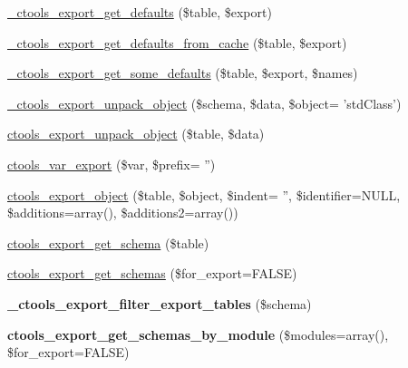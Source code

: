 \begin{DoxyCompactItemize}
\item 
\hyperlink{export_8inc_ad9a45511f03c5f3260f3e102a804229c}{\_\-ctools\_\-export\_\-get\_\-defaults} (\$table, \$export)
\item 
\hyperlink{export_8inc_aab0b6bfc8bf63c6b3e521133e4bbbc5a}{\_\-ctools\_\-export\_\-get\_\-defaults\_\-from\_\-cache} (\$table, \$export)
\item 
\hyperlink{export_8inc_af8d814465da6a2df308247f372cf28d6}{\_\-ctools\_\-export\_\-get\_\-some\_\-defaults} (\$table, \$export, \$names)
\item 
\hyperlink{export_8inc_adc4345fc217c5b8ca3099ea34f824a21}{\_\-ctools\_\-export\_\-unpack\_\-object} (\$schema, \$data, \$object= 'stdClass')
\item 
\hyperlink{export_8inc_a6ab705acdffb0cf4a5db1357c82cbeb5}{ctools\_\-export\_\-unpack\_\-object} (\$table, \$data)
\item 
\hyperlink{export_8inc_a430da819e5a29ba94fcc25dd949a942b}{ctools\_\-var\_\-export} (\$var, \$prefix= '')
\item 
\hyperlink{export_8inc_a70df7f4160524363096623f41967a180}{ctools\_\-export\_\-object} (\$table, \$object, \$indent= '', \$identifier=NULL, \$additions=array(), \$additions2=array())
\item 
\hyperlink{export_8inc_a88e1b7c5b516030dc34cab73f6a2ee70}{ctools\_\-export\_\-get\_\-schema} (\$table)
\item 
\hyperlink{export_8inc_aa06e4d6e162ada14df00a3e420bcd0c1}{ctools\_\-export\_\-get\_\-schemas} (\$for\_\-export=FALSE)
\item 
\hypertarget{export_8inc_a58c175bcc36288d8bcc5706a942881a5}{
{\bfseries \_\-ctools\_\-export\_\-filter\_\-export\_\-tables} (\$schema)}
\label{export_8inc_a58c175bcc36288d8bcc5706a942881a5}

\item 
\hypertarget{export_8inc_a79356fa812d0cb047488e1cf543d954a}{
{\bfseries ctools\_\-export\_\-get\_\-schemas\_\-by\_\-module} (\$modules=array(), \$for\_\-export=FALSE)}
\label{export_8inc_a79356fa812d0cb047488e1cf543d954a}


\end{DoxyCompactItemize}
